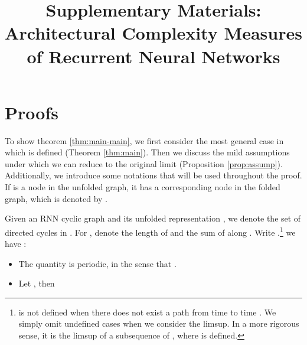 \onecolumn
\title{Supplementary  Materials: Architectural Complexity Measures of Recurrent Neural Networks}


\section{Proofs}
\label{sec:proofs}

To show theorem \ref{thm:main-main}, we first consider the most general case in which  is defined (Theorem \ref{thm:main}). Then we discuss the mild assumptions under which we can reduce to the original limit (Proposition \ref{prop:assump}). Additionally, we introduce some notations that will be used throughout the proof. If
 is a node in the unfolded graph, it has a corresponding node in the folded graph, which is denoted by .

\begin{thm}
\label{thm:main}
  Given an RNN cyclic graph and its unfolded representation , we denote  the set of directed
  cycles in . For , denote  the length of  and  the sum of
   along . Write .\footnote{ is not defined when there does not exist a path from time  to time . We simply omit undefined cases when we consider the limsup. In a more rigorous sense, it is the limsup of a subsequence of , where  is defined.} we have :
  \begin{itemize}
    \item  The quantity  is periodic, in the sense that .
    
    \item Let , then
    
  \end{itemize}
\end{thm}

